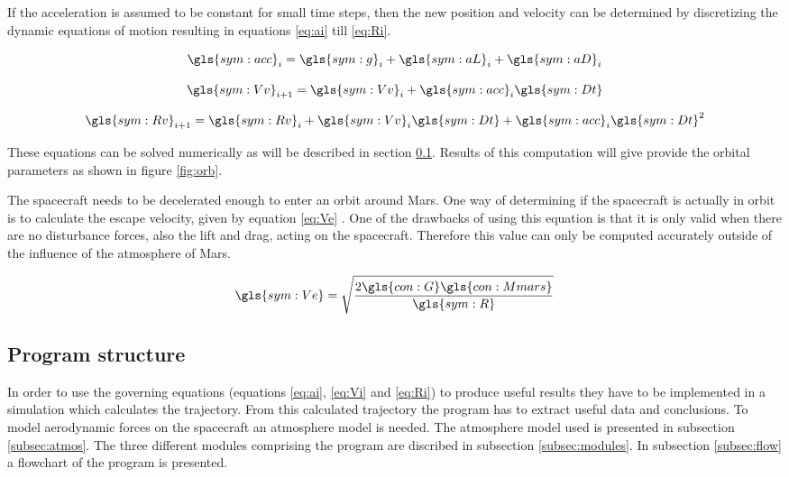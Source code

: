 If the acceleration is assumed to be constant for small time steps, then the new position and velocity can be determined by discretizing the dynamic equations of motion resulting in equations \ref{eq:ai} till \ref{eq:Ri}.

\begin{equation} \label{eq:ai}
\gls{sym:acc}_i = \gls{sym:g}_i + \gls{sym:aL}_i + \gls{sym:aD}_i
\end{equation}

\begin{equation} \label{eq:Vi}
\gls{sym:Vv}_{i+1} = \gls{sym:Vv}_i + \gls{sym:acc}_i \gls{sym:Dt}
\end{equation}

\begin{equation} \label{eq:Ri}
\gls{sym:Rv}_{i+1} = \gls{sym:Rv}_i + \gls{sym:Vv}_i \gls{sym:Dt} + \gls{sym:acc}_i \gls{sym:Dt}^2
\end{equation}

These equations can be solved numerically as will be described in section \ref{sec:prog_struct}. Results of this computation will give provide the orbital parameters as shown in figure \ref{fig:orb}.

The spacecraft needs to be decelerated enough to enter an orbit around Mars. One way of determining if the spacecraft is actually in orbit is to calculate the escape velocity, given by equation \ref{eq:Ve} \cite{Wertz2011}. One of the drawbacks of using this equation is that it is only valid when there are no disturbance forces, also the lift and drag, acting on the spacecraft. Therefore this value can only be computed accurately outside of the influence of the atmosphere of Mars.

\begin{equation} \label{eq:Ve}
\gls{sym:Ve} = \sqrt{\frac{2\gls{con:G}\gls{con:Mmars}}
					{\gls{sym:R}}}
\end{equation}

\subsection{Program structure}\label{sec:prog_struct}

In order to use the governing equations (equations \ref{eq:ai}, \ref{eq:Vi} and \ref{eq:Ri}) to produce useful results they have to be implemented in a simulation which calculates the trajectory. From this calculated trajectory the program has to extract useful data and conclusions. To model aerodynamic forces on the spacecraft an atmosphere model is needed. The atmosphere model used is presented in subsection \ref{subsec:atmos}. The three different modules comprising the program are discribed in subsection \ref{subsec:modules}. In subsection \ref{subsec:flow} a flowchart of the program is presented.

